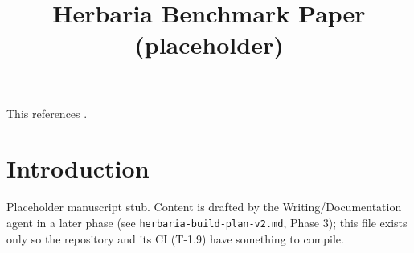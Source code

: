 \documentclass[11pt]{article}
\title{Herbaria Benchmark Paper (placeholder)}
\author{}
\date{}
\begin{document}
\maketitle

This references \cite{smith2020real}.

\section{Introduction}

Placeholder manuscript stub. Content is drafted by the Writing/Documentation agent
in a later phase (see \texttt{herbaria-build-plan-v2.md}, Phase 3); this file exists
only so the repository and its CI (T-1.9) have something to compile.



\end{document}

